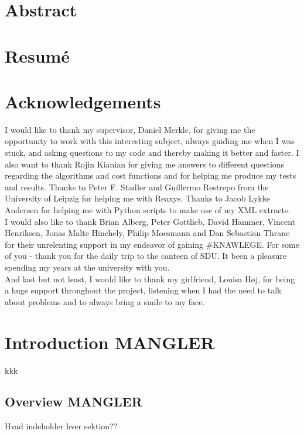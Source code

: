\documentclass[a4paper,10pt,titlepage]{paper}
\begin{document}
\begin{titlepage}
\end{titlepage}

\vfill
\section*{Abstract}

\section*{Resumé}
\newpage

\tableofcontents
\newpage


\section{Acknowledgements}
I would like to thank my supervisor, Daniel Merkle, for giving me the opportunity to work with this interesting subject, always guiding me when I was stuck, and asking questions to my code and thereby making it better and faster. I also want to thank Rojin Kianian for giving me answers to different questions regarding the algorithms and cost functions and for helping me produce my tests and results. Thanks to Peter F. Stadler and Guillermo Restrepo from the University of Leipzig for helping me with Reaxys. Thanks to Jacob Lykke Andersen for helping me with Python scripts to make use of my XML extracts.\\
I would also like to thank Brian Alberg, Peter Gottlieb, David Hammer, Vincent Henriksen, Jonas Malte Hinchely, Philip Moesmann and Dan Sebastian Thrane for their unrelenting support in my endeavor of gaining \#KNAWLEGE. For some of you - thank you for the daily trip to the canteen of SDU. It been a pleasure spending my years at the university with you.\\
And last but not least, I would like to thank my girlfriend, Louisa Høj, for being a huge support throughout the project, listening when I had the need to talk about problems and to always bring a smile to my face.

\section{Introduction MANGLER}
kkk \cite{Grzybowski}\\

\subsection{Overview MANGLER}
Hvad indeholder hver sektion??
\end{document}
